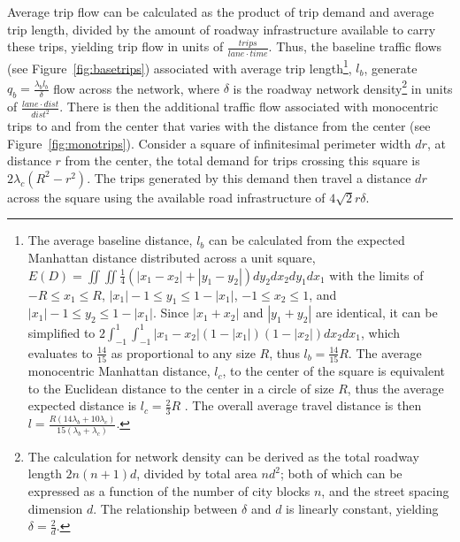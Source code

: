 \documentclass{elsarticle}\usepackage[]{graphicx}\usepackage[]{color}
\begin{document}
Average trip flow can be calculated as the product of trip demand and average trip length, divided by the amount of roadway infrastructure available to carry these trips, yielding trip flow in units of $\frac{trips}{lane \cdot time}$. Thus, the baseline traffic flows (see Figure~\ref{fig:basetrips}) associated with average trip length\footnote{
	The average baseline distance, $l_b$ can be calculated from the expected Manhattan distance distributed across a unit square, $E(D) = \iint\iint \frac{1}{4}\left(|x_1 - x_2| + |y_1 - y_2| \right ) dy_2 dx_2 dy_1 dx_1$ with the limits of $-R \leq x_1 \leq R$, $|x_1|-1 \leq y_1 \leq 1-|x_1|$, $-1 \leq x_2 \leq 1$, and $|x_1|-1 \leq y_2 \leq 1-|x_1|$. Since $|x_1 + x_2|$ and $|y_1 + y_2|$ are identical, it can be simplified to $2\int_{-1}^{1} \int_{-1}^{1} |x_1 - x_2|(1-|x_1|)(1-|x_2|)dx_2 dx_1$, which evaluates to $\frac{14}{15}$ as proportional to any size $R$, thus $l_b = \frac{14}{15}R$. The average monocentric Manhattan distance, $l_c$, to the center of the square is equivalent to the Euclidean distance to the center in a circle of size $R$, thus the average expected distance is $l_c = \frac{2}{3}R$ \cite{Stone1991}. The overall average travel distance is then $l = \frac{R(14\lambda_b + 10\lambda_c)}{15(\lambda_b + \lambda_c)}$.
}, $l_b$, generate $q_b = \frac{\lambda_b l_b}{\delta}$ flow across the network, where $\delta$ is the roadway network density\footnote{
The calculation for network density can be derived as the total roadway length $2n(n+1)d$, divided by total area $nd^2$; both of which can be expressed as a function of the number of city blocks $n$, and the street spacing dimension $d$. The relationship between $\delta$ and $d$ is linearly constant, yielding $\delta = \frac{2}{d}$.
} in units of $\frac{lane \cdot dist}{dist^2}$. There is then the additional traffic flow associated with monocentric trips to and from the center that varies with the distance from the center (see Figure~\ref{fig:monotrips}). Consider a square of infinitesimal perimeter width $dr$, at distance $r$ from the center, the total demand for trips crossing this square is $2\lambda_c (R^2 - r^2)$. The trips generated by this demand then travel a distance $dr$ across the square using the available road infrastructure of $4\sqrt{2}r\delta$.
\end{document}

